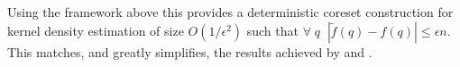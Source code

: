 \documentclass[anon,12pt]{colt2019} %
\newcommand{\zk}[1]{\textcolor{red}{ZK: #1}}
\newcommand{\ip}[1]{\left \langle #1 \right \rangle}
\newcommand{\R}{\mathbb{R}}
\newcommand{\eps}{\epsilon}
\begin{document}
Using the framework above this provides a deterministic coreset construction for kernel density estimation of size $O(1/\eps^2)$ such that $\forall \;q\;\; |\tilde f(q) - f(q)| \le \eps n$. This matches, and greatly simplifies, the results achieved by \cite{DBLP:conf/soda/PhillipsT18} and \cite{DBLP:journals/corr/abs-1802-01751}.










%
%
%
%
\end{document}
